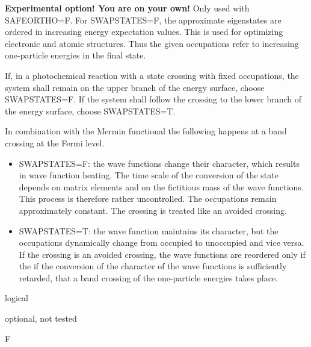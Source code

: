 \documentclass[final,12pt,makeidx,DIV=calc]{article}
\newcommand{\key}[1]{\hfill\break \makebox[1.5in][l]{\bf #1}\hfill\break}
\newcommand{\vdescr}[1]{\makebox[1in][l]{}\parbox[t]{110mm}{#1}\hfill\break}
\newcommand{\vformat}[1]{
\makebox[1in][l]{}\parbox[t]{110mm}{\makebox[1in][l]{Type:}\parbox[t]{2.7in}{#1}}
\hfill\break}
\newcommand{\vrules}[1]{
\makebox[1in][l]{}\parbox[t]{110mm}{\makebox[1in][l]{Rules:}\parbox[t]{2.7in}{#1}}
\hfill\break}
\newcommand{\vdefault}[1]{
\makebox[1in][l]{}\parbox[t]{110mm}
{\makebox[1in][l]{Default:}\parbox[t]{2.7in}{#1}}
\hfill\break}
\newcommand{\mbax}[1]{#1}
\begin{document}
\mbax{\key{SWAPSTATES}
\vdescr{\textbf{Experimental option! You are on your own!}
Only used with SAFEORTHO=F. For SWAPSTATES=F, the approximate
eigenstates are ordered in increasing energy expectation values. This
is used for optimizing electronic and atomic structures. Thus the
given occupations refer to increasing one-particle energies in the
final state.

If, in a photochemical reaction with a state crossing with fixed
occupations, the system shall remain on the upper branch of the energy
surface, choose SWAPSTATES=F. If the system shall follow the crossing
to the lower branch of the energy surface, choose  SWAPSTATES=T.

In combination with the Mermin functional the following happens at a
band crossing at the Fermi level.
\begin{itemize}
\item SWAPSTATES=F: the wave functions change their character, which
results in wave function heating. The time scale of the conversion of
the state depends on matrix elements and on the fictitious mass of the
wave functions. This process is therefore rather uncontrolled. The
occupations remain approximately constant. The crossing is treated
like an avoided crossing.
\item SWAPSTATES=T: the wave function maintains its character, but the
occupations dynamically change from occupied to unoccupied and vice
versa. If the crossing is an avoided crossing, the wave functions are
reordered only if the if the conversion of the character of the wave
functions is sufficiently retarded, that a band crossing of the
one-particle energies takes place.
\end{itemize}}
  \vformat{logical} 
  \vrules{optional, not tested}
  \vdefault{F}}  


\end{document}
